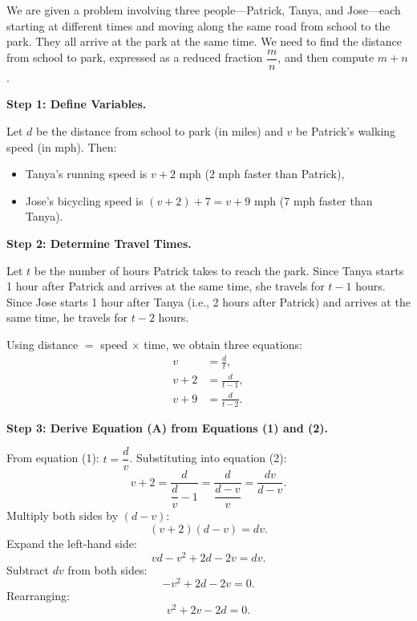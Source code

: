 \documentclass{llmxive}
\begin{document}
\begin{tcolorbox}[title=Teacher Model, breakable]
We are given a problem involving three people---Patrick, Tanya, and Jose---each                                                                                                
starting at different times and moving along the same road from school to the                                                                                                  
park. They all arrive at the park at the same time. We need to find the distance                                                                                               
from school to park, expressed as a reduced fraction $\dfrac{m}{n}$, and then
compute $m+n$.                                                                                                                                                                 
              
\medskip                                                                                                                                                                       
\textbf{Step 1: Define Variables.}

Let $d$ be the distance from school to park (in miles) and $v$ be Patrick's
walking speed (in mph). Then:
\begin{itemize}
  \item Tanya's running speed is $v+2$ mph (2 mph faster than Patrick),
  \item Jose's bicycling speed is $(v+2)+7 = v+9$ mph (7 mph faster than Tanya).
\end{itemize}

\medskip
\textbf{Step 2: Determine Travel Times.}

Let $t$ be the number of hours Patrick takes to reach the park. Since Tanya
starts 1 hour after Patrick and arrives at the same time, she travels for
$t-1$ hours. Since Jose starts 1 hour after Tanya (i.e., 2 hours after
Patrick) and arrives at the same time, he travels for $t-2$ hours.

Using distance $=$ speed $\times$ time, we obtain three equations:
\begin{align}
v &= \frac{d}{t}, \tag{1}\\[6pt]
v+2 &= \frac{d}{t-1}, \tag{2}\\[6pt]
v+9 &= \frac{d}{t-2}. \tag{3}
\end{align}

\medskip
\textbf{Step 3: Derive Equation (A) from Equations (1) and (2).}

From equation (1): $t = \dfrac{d}{v}$. Substituting into equation (2):
\[
v+2 = \frac{d}{\dfrac{d}{v}-1} = \frac{d}{\dfrac{d-v}{v}} = \frac{dv}{d-v}.
\]
Multiply both sides by $(d-v)$:
\[
(v+2)(d-v) = dv.
\]
Expand the left-hand side:
\[
vd - v^2 + 2d - 2v = dv.
\]
Subtract $dv$ from both sides:
\[
-v^2 + 2d - 2v = 0.
\]
Rearranging:
\[
v^2 + 2v - 2d = 0. \tag{A}
\]


\end{tcolorbox}
\end{document}

